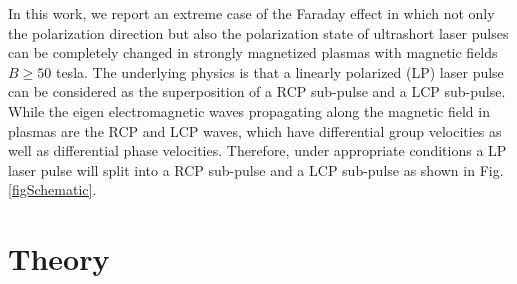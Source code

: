 \documentclass[%
aps,
preprint,
showpacs,
preprintnumbers,
 amsmath,
 amssymb,
 prl,
]{revtex4-1}
\begin{document}
In this work, we report an extreme case of the Faraday effect in which not only the polarization direction but also the polarization state of ultrashort laser pulses can be completely changed in strongly magnetized plasmas with magnetic fields $B \ge 50$ tesla.
The underlying physics is that a linearly polarized (LP) laser pulse can be considered as the superposition of a RCP sub-pulse and a LCP sub-pulse. While the eigen electromagnetic waves propagating along the magnetic field in plasmas are the RCP and LCP waves, which have differential group velocities as well as differential phase velocities.
Therefore, under appropriate conditions a LP laser pulse will split into a RCP sub-pulse and a LCP sub-pulse as shown in Fig. \ref{figSchematic}.

\section{Theory}
\end{document}
